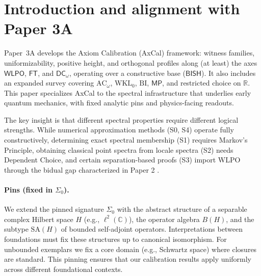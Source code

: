 \documentclass[11pt]{article}
\newcommand{\WLPO}{\mathsf{WLPO}}
\newcommand{\FT}{\mathsf{FT}}
\newcommand{\DCw}{\mathsf{DC}_{\omega}}
\newcommand{\MP}{\mathsf{MP}}
\theoremstyle{plain}
\theoremstyle{definition}
\theoremstyle{remark}
\newcommand{\R}{\mathbb{R}}
\newcommand{\C}{\mathbb{C}}
\newcommand{\BISH}{\mathsf{BISH}}
\newcommand{\ACw}{\mathrm{AC}_\omega}
\newcommand{\WKLz}{\mathrm{WKL}_0}
\newcommand{\BI}{\mathrm{BI}}
\newcommand{\SigmaZero}{\Sigma_{0}}
\begin{document}
\noindent{}

\section{Introduction and alignment with Paper 3A}

Paper~3A \cite{Paper3A} develops the Axiom Calibration (AxCal) framework: witness families, uniformizability, positive height, and orthogonal profiles
along (at least) the axes $\WLPO$, $\FT$, and $\DCw$, operating over a constructive base ($\BISH$). It also includes an expanded survey covering $\ACw$, $\WKLz$, $\BI$, $\MP$, and restricted choice on $\R$.
This paper specializes AxCal to the spectral infrastructure that underlies early quantum mechanics,
with fixed analytic pins and physics-facing readouts.

The key insight is that different spectral properties require different logical strengths. While numerical approximation methods (S0, S4) operate fully constructively, 
determining exact spectral membership (S1) requires Markov's Principle, obtaining classical point spectra from locale spectra (S2) needs Dependent Choice, 
and certain separation-based proofs (S3) import WLPO through the bidual gap characterized in Paper 2 \cite{Paper2}.

\paragraph{Pins (fixed in $\SigmaZero$).}
We extend the pinned signature $\SigmaZero$ with the abstract structure of a separable complex Hilbert space $H$ (e.g., $\ell^2(\C)$), the operator algebra $B(H)$,
and the subtype $\mathrm{SA}(H)$ of bounded self-adjoint operators. Interpretations between foundations must fix these structures up to canonical isomorphism. For unbounded exemplars we fix a
core domain (e.g., Schwartz space) where closures are standard. This pinning ensures that our calibration results apply uniformly across different foundational contexts.
\end{document}
